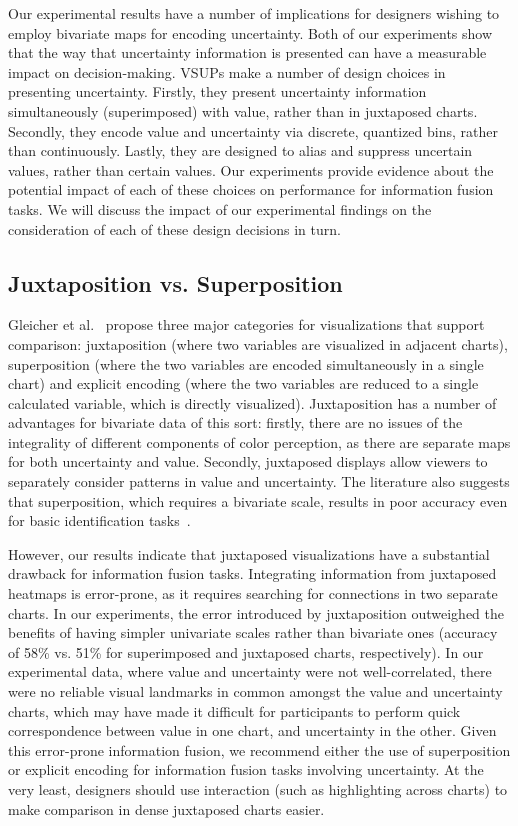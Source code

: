 Our experimental results have a number of implications for designers wishing to employ bivariate maps for encoding uncertainty. Both of our experiments show that the way that uncertainty information is presented can have a measurable impact on decision-making. VSUPs make a number of design choices in presenting uncertainty. Firstly, they present uncertainty information simultaneously (superimposed) with value, rather than in juxtaposed charts. Secondly, they encode value and uncertainty via discrete, quantized bins, rather than continuously. Lastly, they are designed to alias and suppress uncertain values, rather than certain values. Our experiments provide evidence about the potential impact of each of these choices on performance for information fusion tasks. We will discuss the impact of our experimental findings on the consideration of each of these design decisions in turn.

\subsection{Juxtaposition vs. Superposition}

Gleicher et al.~\cite{gleicher2011visual} propose three major categories for visualizations that support comparison: juxtaposition (where two variables are visualized in adjacent charts), superposition (where the two variables are encoded simultaneously in a single chart) and explicit encoding (where the two variables are reduced to a single calculated variable, which is directly visualized). Juxtaposition has a number of advantages for bivariate data of this sort: firstly, there are no issues of the integrality of different components of color perception, as there are separate maps for both uncertainty and value. Secondly, juxtaposed displays allow viewers to separately consider patterns in value and uncertainty. The literature also suggests that superposition, which requires a bivariate scale, results in poor accuracy even for basic identification tasks~\cite{wainer1980empirical}.

However, our results indicate that juxtaposed visualizations have a substantial drawback for information fusion tasks. Integrating information from juxtaposed heatmaps is error-prone, as it requires searching for connections in two separate charts. In our experiments, the error introduced by juxtaposition outweighed the benefits of having simpler univariate scales rather than bivariate ones (accuracy of 58\% vs. 51\% for superimposed and juxtaposed charts, respectively). In our experimental data, where value and uncertainty were not well-correlated, there were no reliable visual landmarks in common amongst the value and uncertainty charts, which may have made it difficult for participants to perform quick correspondence between value in one chart, and uncertainty in the other. Given this error-prone information fusion, we recommend either the use of superposition or explicit encoding for information fusion tasks involving uncertainty. At the very least, designers should use interaction (such as highlighting across charts) to make comparison in dense juxtaposed charts easier.


